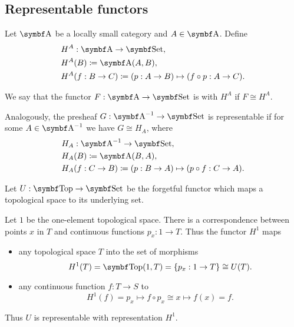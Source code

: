 \subsection{Representable functors}\label{subsec:representable_functors}

\begin{definition}\label{def:representable_functor}
  Let \( \Cat{A} \) be a locally small category and \( A \in \Cat{A} \). Define
  \begin{align*}
     & H^A: \Cat{A} \to \Cat{Set},                                          \\
     & H^A(B) \coloneqq \Cat{A}(A, B),                                      \\
     & H^A(f: B \to C) \coloneqq (p: A \to B) \mapsto (f \circ p: A \to C).
  \end{align*}

  We say that the functor \( F: \Cat{A} \to \Cat{Set} \) is  with  \( H^A \) if \( F \cong H^A \).

  Analogously, the presheaf \( G: \Cat{A}^{-1} \to \Cat{Set} \) is representable if for some \( A \in \Cat{A}^{-1} \) we have \( G \cong H_A \), where
  \begin{align*}
     & H_A: \Cat{A}^{-1} \to \Cat{Set},                                     \\
     & H_A(B) \coloneqq \Cat{A}(B, A),                                      \\
     & H_A(f: C \to B) \coloneqq (p: B \to A) \mapsto (p \circ f: C \to A).
  \end{align*}
\end{definition}

\begin{example}\label{def:top_representable_functor}
  Let \( U: \Cat{Top} \to \Cat{Set} \) be the forgetful functor which maps a topological space to its underlying set.

  Let \( 1 \) be the one-element topological space. There is a correspondence between points \( x \) in \( T \) and continuous functions \( p_x: 1 \to T \). Thus the functor \( H^1 \) maps
  \begin{itemize}
    \item any topological space \( T \) into the set of morphisms
          \begin{equation*}
            H^1(T) = \Cat{Top}(1, T) = \{ p_x: 1 \to T \} \cong U(T).
          \end{equation*}
    \item any continuous function \( f: T \to S \) to
          \begin{equation*}
            H^1(f) = p_x \mapsto f \circ p_x \cong x \mapsto f(x) = f.
          \end{equation*}
  \end{itemize}

  Thus \( U \) is representable with representation \( H^1 \).
\end{example}

